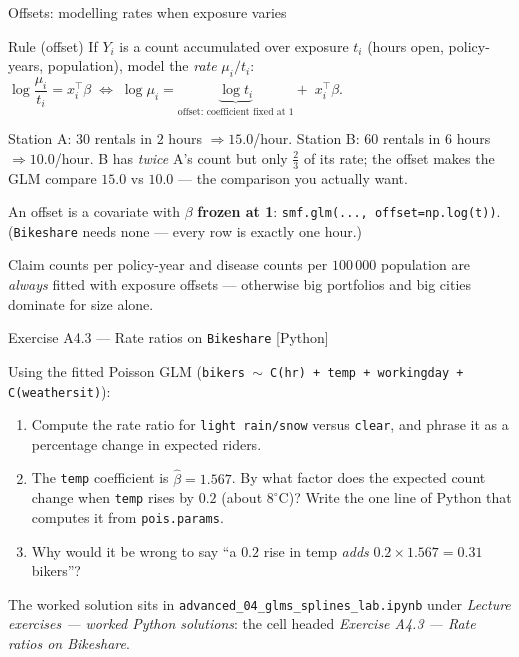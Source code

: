 \documentclass[aspectratio=169,11pt]{beamer}
\begin{document}
\begin{frame}{Offsets: modelling rates when exposure varies}
  \footnotesize
  \begin{block}{Rule (offset)}
    \footnotesize
    If $Y_i$ is a count accumulated over exposure $t_i$ (hours open, policy-years,
    population), model the \emph{rate} $\mu_i/t_i$:
    \quad $\log\dfrac{\mu_i}{t_i} = x_i^{\top}\beta
      \;\Longleftrightarrow\;
      \log\mu_i = \underbrace{\log t_i}_{\text{offset: coefficient fixed at }1} +\; x_i^{\top}\beta$.
  \end{block}
  \begin{numexample}
    Station A: $30$ rentals in $2$ hours $\Rightarrow 15.0$/hour. Station B: $60$
    rentals in $6$ hours $\Rightarrow 10.0$/hour. B has \emph{twice} A's count but
    only $\tfrac{2}{3}$ of its rate; the offset makes the GLM compare $15.0$ vs
    $10.0$ --- the comparison you actually want.
  \end{numexample}
  \begin{takeaway}
    An offset is a covariate with $\beta$ \textbf{frozen at 1}:
    \texttt{smf.glm(..., offset=np.log(t))}. (\texttt{Bikeshare} needs none ---
    every row is exactly one hour.)
  \end{takeaway}
  \begin{industry}
    Claim counts per policy-year and disease counts per $100\,000$ population are
    \emph{always} fitted with exposure offsets --- otherwise big portfolios and big
    cities dominate for size alone.
  \end{industry}
\end{frame}

\begin{frame}{Exercise A4.3 --- Rate ratios on \texttt{Bikeshare} [Python]}
\begin{exercise}
  Using the fitted Poisson GLM
  (\texttt{bikers $\sim$ C(hr) + temp + workingday + C(weathersit)}):
  \begin{enumerate}
    \item Compute the rate ratio for \texttt{light rain/snow} versus \texttt{clear},
          and phrase it as a percentage change in expected riders.
    \item The \texttt{temp} coefficient is $\hat\beta = 1.567$. By what factor does the
          expected count change when \texttt{temp} rises by $0.2$ (about
          $8^{\circ}$C)? Write the one line of Python that computes it from
          \texttt{pois.params}.
    \item Why would it be wrong to say ``a $0.2$ rise in temp \emph{adds}
          $0.2\times 1.567 = 0.31$ bikers''?
  \end{enumerate}
\end{exercise}
\begin{labnote}
  The worked solution sits in \texttt{advanced\_04\_glms\_splines\_lab.ipynb} under
  \emph{Lecture exercises --- worked Python solutions}: the cell headed
  \emph{Exercise A4.3 --- Rate ratios on Bikeshare}.
\end{labnote}
\end{frame}
\end{document}
